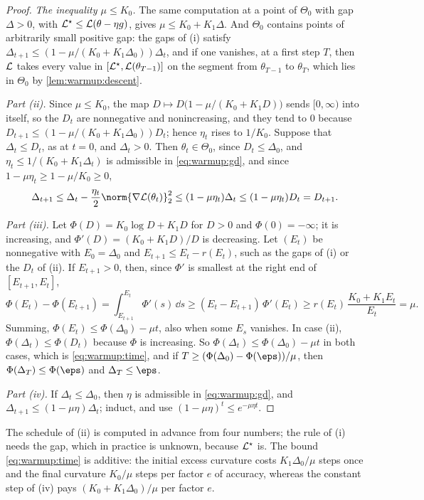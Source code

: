 \begin{refsection}
\begin{proof}
\emph{The inequality $\mu\le K_0$.} The same computation at a point of $\Theta_0$ with gap $\Delta>0$, with $\mathcal{L}^\star\le\mathcal{L}(\theta-\eta g)$, gives $\mu\le K_0+K_1\Delta$. And $\Theta_0$ contains points of arbitrarily small positive gap: the gaps of (i) satisfy $\Delta_{t+1}\le(1-\mu/(K_0+K_1\Delta_0))\Delta_t$, and if one vanishes, at a first step $T$, then $\mathcal{L}$ takes every value in $[\mathcal{L}^\star,\mathcal{L}(\theta_{T-1})]$ on the segment from $\theta_{T-1}$ to $\theta_T$, which lies in $\Theta_0$ by \cref{lem:warmup:descent}.

\emph{Part (ii).} Since $\mu\le K_0$, the map $D\mapsto D\bigl(1-\mu/(K_0+K_1D)\bigr)$ sends $[0,\infty)$ into itself, so the $D_t$ are nonnegative and nonincreasing, and they tend to $0$ because $D_{t+1}\le(1-\mu/(K_0+K_1\Delta_0))D_t$; hence $\eta_t$ rises to $1/K_0$. Suppose that $\Delta_t\le D_t$, as at $t=0$, and $\Delta_t>0$. Then $\theta_t\in\Theta_0$, since $D_t\le\Delta_0$, and $\eta_t\le1/(K_0+K_1\Delta_t)$ is admissible in \eqref{eq:warmup:gd}, and since $1-\mu\eta_t\ge1-\mu/K_0\ge0$,
\[
  \Delta_{t+1}\le\Delta_t-\frac{\eta_t}2\norm{\nabla\Loss(\theta_t)}_2^2\le(1-\mu\eta_t)\Delta_t\le(1-\mu\eta_t)D_t=D_{t+1}.
\]

\emph{Part (iii).} Let $\Phi(D)=K_0\log D+K_1D$ for $D>0$ and $\Phi(0)=-\infty$; it is increasing, and $\Phi'(D)=(K_0+K_1D)/D$ is decreasing. Let $(E_t)$ be nonnegative with $E_0=\Delta_0$ and $E_{t+1}\le E_t-r(E_t)$, such as the gaps of (i) or the $D_t$ of (ii). If $E_{t+1}>0$, then, since $\Phi'$ is smallest at the right end of $[E_{t+1},E_t]$,
\[
  \Phi(E_t)-\Phi(E_{t+1})=\int_{E_{t+1}}^{E_t}\Phi'(s)\,\dd s\ge(E_t-E_{t+1})\,\Phi'(E_t)\ge r(E_t)\,\frac{K_0+K_1E_t}{E_t}=\mu .
\]
Summing, $\Phi(E_t)\le\Phi(\Delta_0)-\mu t$, also when some $E_s$ vanishes. In case (ii), $\Phi(\Delta_t)\le\Phi(D_t)$ because $\Phi$ is increasing. So $\Phi(\Delta_t)\le\Phi(\Delta_0)-\mu t$ in both cases, which is \eqref{eq:warmup:time}, and if $T\ge(\Phi(\Delta_0)-\Phi(\eps))/\mu$, then $\Phi(\Delta_T)\le\Phi(\eps)$ and $\Delta_T\le\eps$.

\emph{Part (iv).} If $\Delta_t\le\Delta_0$, then $\eta$ is admissible in \eqref{eq:warmup:gd}, and $\Delta_{t+1}\le(1-\mu\eta)\Delta_t$; induct, and use $(1-\mu\eta)^t\le e^{-\mu\eta t}$.
\end{proof}

The schedule of (ii) is computed in advance from four numbers; the rule of (i) needs the gap, which in practice is unknown, because $\mathcal{L}^\star$ is. The bound \eqref{eq:warmup:time} is additive: the initial excess curvature costs $K_1\Delta_0/\mu$ steps once and the final curvature $K_0/\mu$ steps per factor $e$ of accuracy, whereas the constant step of (iv) pays $(K_0+K_1\Delta_0)/\mu$ per factor $e$.


\end{refsection}
